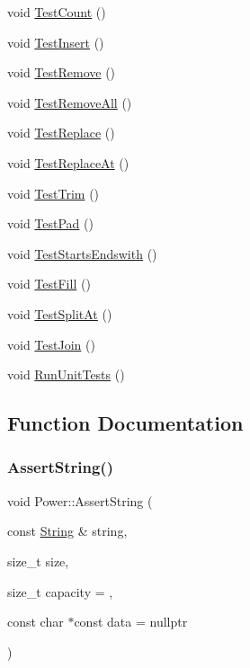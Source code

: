 \begin{DoxyCompactItemize}
\item 
void \hyperlink{namespace_power_ae4542ac2c3572f11b82b87325716284c}{Test\+Count} ()
\item 
void \hyperlink{namespace_power_a14fd95cb9dec263deb7131de8337a930}{Test\+Insert} ()
\item 
void \hyperlink{namespace_power_a4119a2b48f2dff71b6ca87cc2f94b71e}{Test\+Remove} ()
\item 
void \hyperlink{namespace_power_ac4dfc487f0585994b48205120571f03a}{Test\+Remove\+All} ()
\item 
void \hyperlink{namespace_power_aa5f53535e79018dee986c4d6c732dfa2}{Test\+Replace} ()
\item 
void \hyperlink{namespace_power_a8bfbc26ed7a2c9816a299ed990302283}{Test\+Replace\+At} ()
\item 
void \hyperlink{namespace_power_ae3b2ca85b1754df91c10a59ed383a9ba}{Test\+Trim} ()
\item 
void \hyperlink{namespace_power_a3d4ab2663e62978f111c66a1dfeabace}{Test\+Pad} ()
\item 
void \hyperlink{namespace_power_a8624c60b65b1b0f8859122599816d25b}{Test\+Starts\+Endswith} ()
\item 
void \hyperlink{namespace_power_ac75f67a1bb1ba76b63fb032055217d0a}{Test\+Fill} ()
\item 
void \hyperlink{namespace_power_a7319d9f5b0f4f0a3773c4c7efe7a4759}{Test\+Split\+At} ()
\item 
void \hyperlink{namespace_power_a5cc8bd07de43764591174f75a8da14fe}{Test\+Join} ()
\item 
void \hyperlink{namespace_power_a98ecb039bc50b27644cdee95dff097d3}{Run\+Unit\+Tests} ()
\end{DoxyCompactItemize}


\subsection{Function Documentation}
\mbox{\label{namespace_power_a518010e2cb8ba2afb94237640eb33bc8}} 
\subsubsection{\texorpdfstring{Assert\+String()}{AssertString()}}
{\footnotesize\ttfamily void Power\+::\+Assert\+String (\begin{DoxyParamCaption}\item[{const \hyperlink{class_power_1_1_string}{String} \&}]{string,  }\item[{size\+\_\+t}]{size,  }\item[{size\+\_\+t}]{capacity = {},  }\item[{const char $\ast$const}]{data = {\ttfamily nullptr} }\end{DoxyParamCaption})}

